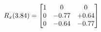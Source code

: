 \documentclass[preview]{standalone}
\begin{document}
\begin{align*}
\special{dvisvgm:raw <g id='unique000'>}R_{x}(3.84) = \begin{bmatrix}1 & 0 & 0 \\0 & -0.77 & +0.64 \\0 & -0.64 & -0.77\end{bmatrix}\special{dvisvgm:raw </g>}
\end{align*}
\end{document}
